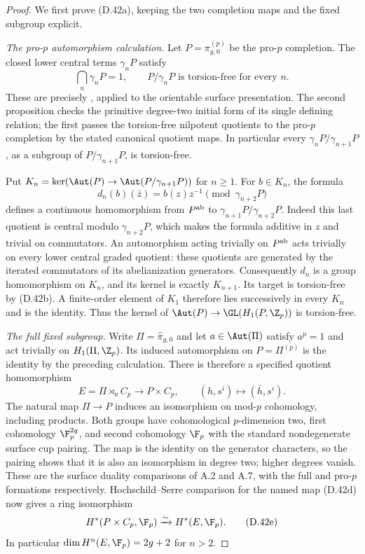 \begin{proof}
We first prove (D.42a), keeping the two completion
maps and the fixed subgroup explicit.

\emph{The pro-$p$ automorphism calculation.}
Let $P=\pi_{g,0}^{(p)}$ be the pro-$p$ completion.
The closed lower central terms $\gamma_nP$
satisfy
\[
 \bigcap_n\gamma_nP=1,
 \qquad P/\gamma_nP\text{ is torsion-free for every }n.
                                                        \tag{D.42b}
\]
These are precisely
\cite[Propositions 2.14--2.15, pp.~1515--1516]{A-Morales2024},
applied to the orientable surface presentation.
The second proposition checks the primitive degree-two
initial form of its single defining relation; the
first passes the torsion-free nilpotent quotients to
the pro-$p$ completion by the stated canonical quotient
maps.  In particular every
$\gamma_nP/\gamma_{n+1}P$, as a subgroup of
$P/\gamma_{n+1}P$, is torsion-free.

Put
$K_n=\ker(\Aut(P)\to\Aut(P/\gamma_{n+1}P))$ for $n\geq1$.
For $b\in K_n$, the formula
\[
 d_n(b)(\bar z)=b(z)z^{-1}\pmod{\gamma_{n+2}P}
                                                        \tag{D.42c}
\]
defines a continuous homomorphism from $P^{\rm ab}$
to $\gamma_{n+1}P/\gamma_{n+2}P$.
Indeed this last quotient is central modulo
$\gamma_{n+2}P$, which makes the formula additive
in $z$ and trivial on commutators.
An automorphism acting trivially on $P^{\rm ab}$
acts trivially on every lower central graded quotient:
these quotients are generated by the iterated
commutators of its abelianization generators.
Consequently $d_n$ is a group homomorphism on $K_n$,
and its kernel is exactly $K_{n+1}$.
Its target is torsion-free by (D.42b).
A finite-order element of $K_1$ therefore lies
successively in every $K_n$ and is the identity.
Thus the kernel of
$\Aut(P)\to\GL(H_1(P,\Z_p))$ is torsion-free.

\emph{The full fixed subgroup.}
Write $\Pi=\widehat\pi_{g,0}$ and let
$a\in\Aut(\Pi)$ satisfy $a^p=1$ and act trivially
on $H_1(\Pi,\Z_p)$.
Its induced automorphism on $P=\Pi^{(p)}$ is the
identity by the preceding calculation.
There is therefore a specified quotient homomorphism
\[
 E=\Pi\rtimes_a C_p\longrightarrow P\times C_p,
             \qquad(h,s^i)\longmapsto(\bar h,s^i).
                                                        \tag{D.42d}
\]
The natural map $\Pi\to P$ induces an isomorphism
on mod-$p$ cohomology, including products.
Both groups have cohomological $p$-dimension two,
first cohomology $\F_p^{2g}$, and second cohomology
$\F_p$ with the standard nondegenerate surface
cup pairing.  The map is the identity on the
generator characters, so the pairing shows that
it is also an isomorphism in degree two; higher
degrees vanish.  These are the surface duality
comparisons of A.2 and A.7, with the full and
pro-$p$ formations respectively.
Hochschild--Serre comparison for the named map
(D.42d) now gives a ring isomorphism
\[
 H^*(P\times C_p,\F_p)\xrightarrow{\sim}H^*(E,\F_p).
                                                        \tag{D.42e}
\]
In particular $\dim H^n(E,\F_p)=2g+2$ for $n>2$.


\end{proof}
